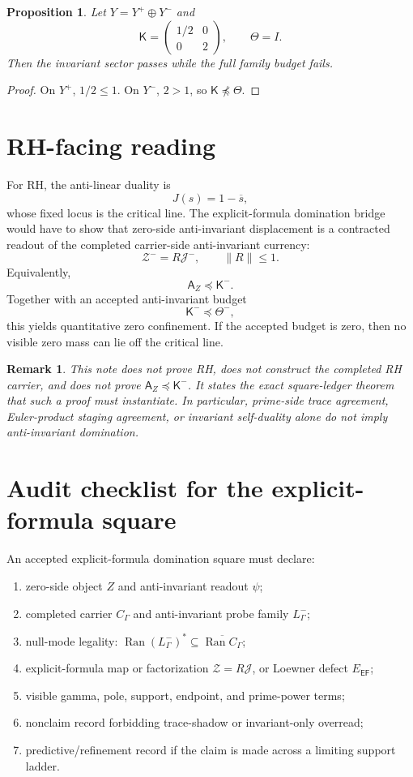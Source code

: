 \documentclass[11pt]{article}
\newtheorem{proposition}[theorem]{Proposition}
\newtheorem{remark}[theorem]{Remark}
\DeclareMathOperator{\Ran}{Ran}
\newcommand{\Kmat}{\mathsf K}
\newcommand{\AZ}{\mathsf A_Z}
\newcommand{\EF}{\mathsf{EF}}
\begin{document}
\begin{proposition}
Let $Y=Y^+\oplus Y^-$ and
\[
  \Kmat=\begin{pmatrix}1/2&0\\0&2\end{pmatrix},
  \qquad
  \Theta=I.
\]
Then the invariant sector passes while the full family budget fails.
\end{proposition}

\begin{proof}
On $Y^+$, $1/2\le1$.  On $Y^-$, $2>1$, so $\Kmat\npreceq\Theta$.
\end{proof}

\section{RH-facing reading}
For RH, the anti-linear duality is
\[
  J(s)=1-\overline{s},
\]
whose fixed locus is the critical line.  The explicit-formula domination bridge would have to show that zero-side anti-invariant displacement is a contracted readout of the completed carrier-side anti-invariant currency:
\[
  \mathcal Z^- = R\mathcal J^- ,\qquad \|R\|\le1.
\]
Equivalently,
\[
  \AZ\preceq \Kmat^- .
\]
Together with an accepted anti-invariant budget
\[
  \Kmat^-\preceq \Theta^- ,
\]
this yields quantitative zero confinement.  If the accepted budget is zero, then no visible zero mass can lie off the critical line.

\begin{remark}
This note does not prove RH, does not construct the completed RH carrier, and does not prove $\AZ\preceq\Kmat^-$.  It states the exact square-ledger theorem that such a proof must instantiate.  In particular, prime-side trace agreement, Euler-product staging agreement, or invariant self-duality alone do not imply anti-invariant domination.
\end{remark}

\section{Audit checklist for the explicit-formula square}
An accepted explicit-formula domination square must declare:
\begin{enumerate}[label=(\arabic*)]
  \item zero-side object $Z$ and anti-invariant readout $\psi$;
  \item completed carrier $C_\Gamma$ and anti-invariant probe family $L^-_\Gamma$;
  \item null-mode legality: $\Ran(L^-_\Gamma)^*\subseteq\overline{\Ran C_\Gamma}$;
  \item explicit-formula map or factorization $\mathcal Z=R\mathcal J$, or Loewner defect $E_{\EF}$;
  \item visible gamma, pole, support, endpoint, and prime-power terms;
  \item nonclaim record forbidding trace-shadow or invariant-only overread;
  \item predictive/refinement record if the claim is made across a limiting support ladder.
\end{enumerate}
\end{document}
